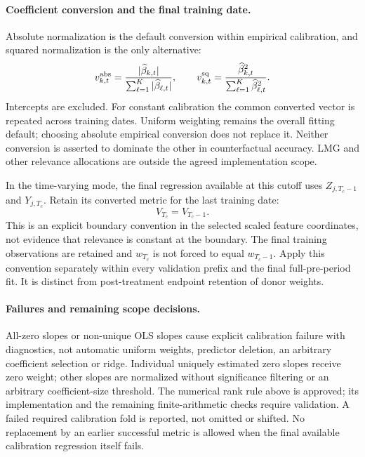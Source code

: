 \documentclass[11pt]{article}
\begin{document}
\paragraph{Coefficient conversion and the final training date.}
Absolute normalization is the default conversion within empirical
calibration, and squared normalization is the only alternative:
\[
 v_{k,t}^{\rm abs}=\frac{|\widehat\beta_{k,t}|}
 {\sum_{\ell=1}^K|\widehat\beta_{\ell,t}|},\qquad
 v_{k,t}^{\rm sq}=\frac{\widehat\beta_{k,t}^2}
 {\sum_{\ell=1}^K\widehat\beta_{\ell,t}^2}.
\]
Intercepts are excluded. For constant calibration the common converted
vector is repeated across training dates. Uniform weighting remains the
overall fitting default; choosing absolute empirical conversion does not
replace it. Neither conversion is asserted to dominate the other in
counterfactual accuracy. LMG and other relevance allocations are outside
the agreed implementation scope.

In the time-varying mode, the final regression available at this cutoff
uses $Z_{j,T_c-1}$ and $Y_{j,T_c}$. Retain its converted metric for the
last training date:
\[
 V_{T_c}=V_{T_c-1}.
\]
This is an explicit boundary convention in the selected scaled feature
coordinates, not evidence that relevance is constant at the boundary.
The final training observations are retained and $w_{T_c}$ is not forced
to equal $w_{T_c-1}$. Apply this convention separately within every
validation prefix and the final full-pre-period fit. It is distinct from
post-treatment endpoint retention of donor weights.

\paragraph{Failures and remaining scope decisions.}
All-zero slopes or non-unique OLS slopes cause explicit calibration
failure with diagnostics, not automatic uniform weights, predictor
deletion, an arbitrary coefficient selection or ridge. Individual
uniquely estimated zero slopes receive zero weight; other slopes are
normalized without significance filtering or an arbitrary coefficient-size
threshold. The numerical rank rule above is approved; its implementation
and the remaining finite-arithmetic checks require validation.
A failed required calibration fold is reported, not
omitted or shifted. No replacement by an earlier successful metric is
allowed when the final available calibration regression itself fails.
\end{document}
